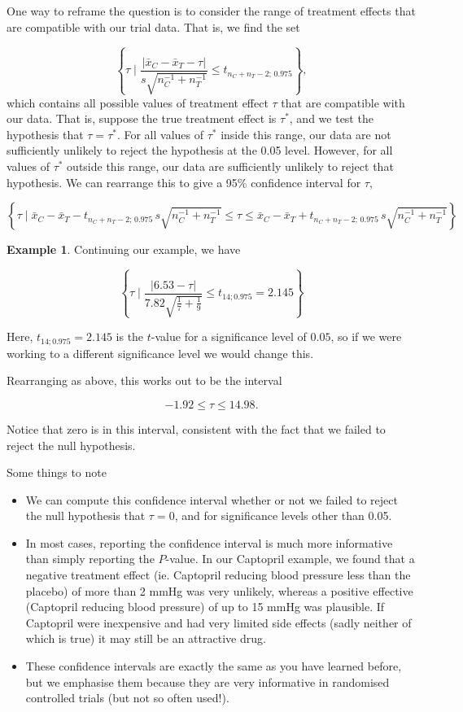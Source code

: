 \documentclass[
  openany]{book}
\providecommand{\tightlist}{%
  \setlength{\itemsep}{0pt}\setlength{\parskip}{0pt}}
\theoremstyle{definition}
\theoremstyle{definition}
\newtheorem{example}{Example}[chapter]
\theoremstyle{definition}
\theoremstyle{definition}
\theoremstyle{remark}
\begin{document}
One way to reframe the question is to consider the range of treatment effects that are compatible with our trial data. That is, we find the set

\[\left\lbrace \tau \mid \frac{\lvert \bar{x}_C - \bar{x}_T - \tau \rvert}{s\sqrt{n_C^{-1} + n_T^{-1}}} \leq t_{n_C+n_T-2;\,0.975} \right\rbrace, \]
which contains all possible values of treatment effect \(\tau\) that are compatible with our data. That is, suppose the true treatment effect is \(\tau^*\), and we test the hypothesis that \(\tau = \tau^*\). For all values of \(\tau^*\) inside this range, our data are not sufficiently unlikely to reject the hypothesis at the 0.05 level. However, for all values of \(\tau^*\) outside this range, our data are sufficiently unlikely to reject that hypothesis. We can rearrange this to give a 95\% confidence interval for \(\tau\),

\[\left\lbrace \tau \mid \bar{x}_C - \bar{x}_T - t_{n_C+n_T-2;\,0.975}\,s\sqrt{n_C^{-1} + n_T^{-1}} \leq \tau \leq \bar{x}_C - \bar{x}_T + t_{n_C+n_T-2;\,0.975}\,s\sqrt{n_C^{-1} + n_T^{-1}}  \right\rbrace \]

\begin{example}
Continuing our example, we have

\[\left\lbrace \tau \mid \frac{\lvert 6.53 - \tau \rvert}{7.82\sqrt{\frac{1}{7} + \frac{1}{9}}} \leq t_{14;0.975} = 2.145 \right\rbrace \]

Here, \(t_{14;0.975} = 2.145\) is the \(t\)-value for a significance level of \(0.05\), so if we were working to a different significance level we would change this.

Rearranging as above, this works out to be the interval

\[
-1.92 \leq  \tau \leq 14.98.
\]

Notice that zero is in this interval, consistent with the fact that we failed to reject the null hypothesis.
\end{example}

Some things to note

\begin{itemize}
\tightlist
\item
  We can compute this confidence interval whether or not we failed to reject the null hypothesis that \(\tau=0\), and for significance levels other than 0.05.
\item
  In most cases, reporting the confidence interval is much more informative than simply reporting the \(P\)-value. In our Captopril example, we found that a negative treatment effect (ie. Captopril reducing blood pressure less than the placebo) of more than 2 mmHg was very unlikely, whereas a positive effective (Captopril reducing blood pressure) of up to 15 mmHg was plausible. If Captopril were inexpensive and had very limited side effects (sadly neither of which is true) it may still be an attractive drug.
\item
  These confidence intervals are exactly the same as you have learned before, but we emphasise them because they are very informative in randomised controlled trials (but not so often used!).
\end{itemize}
\end{document}
